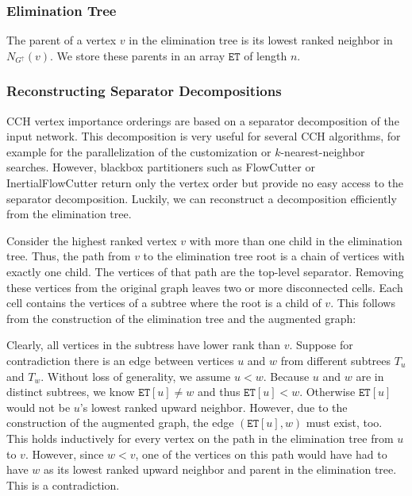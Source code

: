 \documentclass[a4paper, english, cleveref]{lipics-v2021}
\newcommand*{\gchu}{G^{\uparrow}}
\begin{document}
\subsubsection{Elimination Tree}

The parent of a vertex $v$ in the elimination tree is its lowest ranked neighbor in $N_{\gchu}(v)$.
We store these parents in an array $\mathtt{ET}$ of length $n$.

\subsubsection{Reconstructing Separator Decompositions}
\label{sec:reconstruct_sep_tree}

CCH vertex importance orderings are based on a separator decomposition of the input network.
This decomposition is very useful for several CCH algorithms, for example for the parallelization of the customization or $k$-nearest-neighbor searches.
However, blackbox partitioners such as FlowCutter or InertialFlowCutter return only the vertex order but provide no easy access to the separator decomposition.
Luckily, we can reconstruct a decomposition efficiently from the elimination tree.

Consider the highest ranked vertex $v$ with more than one child in the elimination tree.
Thus, the path from $v$ to the elimination tree root is a chain of vertices with exactly one child.
The vertices of that path are the top-level separator.
Removing these vertices from the original graph leaves two or more disconnected cells.
Each cell contains the vertices of a subtree where the root is a child of $v$.
This follows from the construction of the elimination tree and the augmented graph:

Clearly, all vertices in the subtress have lower rank than $v$.
Suppose for contradiction there is an edge between vertices $u$ and $w$ from different subtrees $T_u$ and $T_w$.
Without loss of generality, we assume $u < w$.
Because $u$ and $w$ are in distinct subtrees, we know $\mathtt{ET}[u] \neq w$ and thus $\mathtt{ET}[u] < w$.
Otherwise $\mathtt{ET}[u]$ would not be $u$'s lowest ranked upward neighbor.
However, due to the construction of the augmented graph, the edge $(\mathtt{ET}[u], w)$ must exist, too.
This holds inductively for every vertex on the path in the elimination tree from $u$ to $v$.
However, since $w < v$, one of the vertices on this path would have had to have $w$ as its lowest ranked upward neighbor and parent in the elimination tree.
This is a contradiction.
\end{document}
